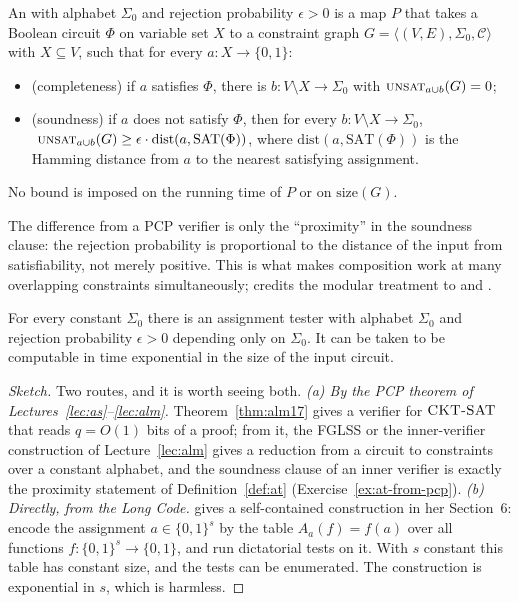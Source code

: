 \begin{definition}\label{def:at}
An  with alphabet $\Sigma_0$ and rejection probability $\epsilon>0$ is a map $P$ that takes a Boolean circuit $\Phi$ on variable set $X$ to a constraint graph $G=\langle(V,E),\Sigma_0,\mathcal C\rangle$ with $X\subseteq V$, such that for every $a\colon X\to\{0,1\}$:
\begin{itemize}
  \item (completeness) if $a$ satisfies $\Phi$, there is $b\colon V\setminus X\to\Sigma_0$ with $\textsc{unsat}_{a\cup b}(G)=0$;
  \item (soundness) if $a$ does not satisfy $\Phi$, then for every $b\colon V\setminus X\to\Sigma_0$, $\ \textsc{unsat}_{a\cup b}(G)\ge\epsilon\cdot\mathrm{dist}(a,\mathrm{SAT}(\Phi))$,
        where $\mathrm{dist}(a,\mathrm{SAT}(\Phi))$ is the Hamming distance from $a$ to the nearest satisfying assignment.
\end{itemize}
No bound is imposed on the running time of $P$ or on $\mathrm{size}(G)$.
\end{definition}

\noindent
The difference from a PCP verifier is only the ``proximity'' in the soundness clause: the rejection probability is proportional to the distance of the input from satisfiability, not merely positive.  This is what makes composition work at many overlapping constraints simultaneously; \citet{Dinur07} credits the modular treatment to \citet{DinurReingold04} and \citet{BGHSV06}.

\begin{lemma}\label{lem:at-exists}
For every constant $\Sigma_0$ there is an assignment tester with alphabet $\Sigma_0$ and rejection probability $\epsilon>0$ depending only on $\Sigma_0$.  It can be taken to be computable in time exponential in the size of the input circuit.
\end{lemma}
\begin{proof}[Sketch]
Two routes, and it is worth seeing both.
\emph{(a) By the PCP theorem of Lectures~\ref{lec:as}--\ref{lec:alm}.}  Theorem~\ref{thm:alm17} gives a verifier for $\textsc{CKT-SAT}$ that reads $q=O(1)$ bits of a proof; from it, the FGLSS or the inner-verifier construction of Lecture~\ref{lec:alm} gives a reduction from a circuit to constraints over a constant alphabet, and the soundness clause of an inner verifier is exactly the proximity statement of Definition~\ref{def:at} (Exercise~\ref{ex:at-from-pcp}).
\emph{(b) Directly, from the Long Code.}  \citet{Dinur07} gives a self-contained construction in her Section~6: encode the assignment $a\in\{0,1\}^s$ by the table $A_a(f)=f(a)$ over all functions $f\colon\{0,1\}^s\to\{0,1\}$, and run dictatorial tests on it.  With $s$ constant this table has constant size, and the tests can be enumerated.
The construction is exponential in $s$, which is harmless.
\end{proof}

